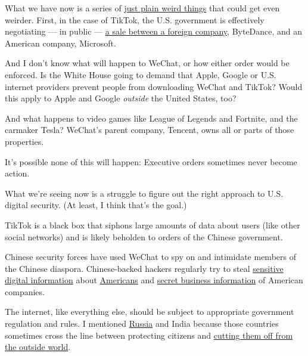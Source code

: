 What we have now is a series of
\href{https://www.nytimes3xbfgragh.onion/2020/08/03/technology/tiktok-microsoft.html}{just
plain weird things} that could get even weirder. First, in the case of
TikTok, the U.S. government is effectively negotiating --- in public ---
\href{https://www.nytimes3xbfgragh.onion/2020/08/03/technology/trump-tiktok-microsoft.html}{a
sale between a foreign company}, ByteDance, and an American company,
Microsoft.

And I don't know what will happen to WeChat, or how either order would
be enforced. Is the White House going to demand that Apple, Google or
U.S. internet providers prevent people from downloading WeChat and
TikTok? Would this apply to Apple and Google \emph{outside} the United
States, too?

And what happens to video games like League of Legends and Fortnite, and
the carmaker Tesla? WeChat's parent company, Tencent, owns all or parts
of those properties.

It's possible none of this will happen: Executive orders sometimes never
become action.

What we're seeing now is a struggle to figure out the right approach to
U.S. digital security. (At least, I think that's the goal.)

TikTok is a black box that siphons large amounts of data about users
(like other social networks) and is likely beholden to orders of the
Chinese government.

Chinese security forces have used WeChat to spy on and intimidate
members of the Chinese diaspora. Chinese-backed hackers regularly try to
steal
\href{https://www.nytimes3xbfgragh.onion/2015/06/05/us/breach-in-a-federal-computer-system-exposes-personnel-data.html}{sensitive
digital information} about
\href{https://www.nytimes3xbfgragh.onion/2020/02/10/us/politics/equifax-hack-china.html}{Americans}
and
\href{https://www.nytimes3xbfgragh.onion/2020/07/21/us/politics/china-hacking-coronavirus-vaccine.html}{secret
business information} of American companies.

The internet, like everything else, should be subject to appropriate
government regulation and rules. I mentioned
\href{https://www.nytimes3xbfgragh.onion/2018/04/18/world/europe/russia-telegram-shutdown.html}{Russia}
and India because those countries sometimes cross the line between
protecting citizens and
\href{https://www.nytimes3xbfgragh.onion/2019/02/14/technology/india-internet-censorship.html}{cutting
them off from the outside world}.

